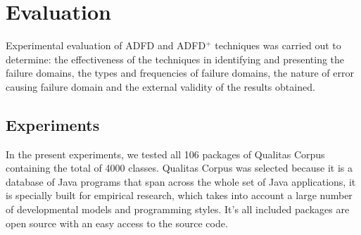 \begin{enumerate}
%

%
%


\end{enumerate}




\section{Evaluation}
Experimental evaluation of ADFD and ADFD$^+$ techniques was carried out to determine: the effectiveness of the techniques in identifying and presenting the failure domains, the types and frequencies of failure domains, the nature of error causing failure domain and the external validity of the results obtained. 


\subsection{Experiments}
In the present experiments, we tested all 106 packages of Qualitas Corpus containing the total of 4000 classes. Qualitas Corpus was selected because it is a database of Java programs that span across the whole set of Java applications, it is specially built for empirical research, which takes into account a large number of developmental models and programming styles. It's all included packages are open source with an easy access to the source code.

